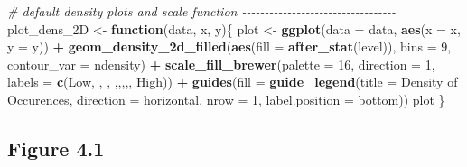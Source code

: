 \documentclass[
]{book}
\newenvironment{Shaded}{\begin{snugshade}}{\end{snugshade}}
\newcommand{\AttributeTok}[1]{\textcolor[rgb]{0.13,0.29,0.53}{#1}}
\newcommand{\CommentTok}[1]{\textcolor[rgb]{0.56,0.35,0.01}{\textit{#1}}}
\newcommand{\ControlFlowTok}[1]{\textcolor[rgb]{0.13,0.29,0.53}{\textbf{#1}}}
\newcommand{\DecValTok}[1]{\textcolor[rgb]{0.00,0.00,0.81}{#1}}
\newcommand{\FunctionTok}[1]{\textcolor[rgb]{0.13,0.29,0.53}{\textbf{#1}}}
\newcommand{\NormalTok}[1]{#1}
\newcommand{\OtherTok}[1]{\textcolor[rgb]{0.56,0.35,0.01}{#1}}
\newcommand{\SpecialCharTok}[1]{\textcolor[rgb]{0.81,0.36,0.00}{\textbf{#1}}}
\newcommand{\StringTok}[1]{\textcolor[rgb]{0.31,0.60,0.02}{#1}}
\begin{document}
\begin{Shaded}
\begin{Highlighting}[]
\CommentTok{\# default density plots and scale function {-}{-}{-}{-}{-}{-}{-}{-}{-}{-}{-}{-}{-}{-}{-}{-}{-}{-}{-}{-}{-}{-}{-}{-}{-}{-}{-}{-}{-}{-}{-}{-}{-}{-}}
\NormalTok{plot\_dens\_2D }\OtherTok{\textless{}{-}} \ControlFlowTok{function}\NormalTok{(data, x, y)\{}
\NormalTok{  plot }\OtherTok{\textless{}{-}} \FunctionTok{ggplot}\NormalTok{(}\AttributeTok{data =}\NormalTok{ data, }\FunctionTok{aes}\NormalTok{(}\AttributeTok{x =}\NormalTok{ x, }\AttributeTok{y =}\NormalTok{ y)) }\SpecialCharTok{+} 
    \FunctionTok{geom\_density\_2d\_filled}\NormalTok{(}\FunctionTok{aes}\NormalTok{(}\AttributeTok{fill =} \FunctionTok{after\_stat}\NormalTok{(level)),}
                           \AttributeTok{bins =} \DecValTok{9}\NormalTok{, }\AttributeTok{contour\_var =} \StringTok{\textquotesingle{}ndensity\textquotesingle{}}\NormalTok{) }\SpecialCharTok{+}
    \FunctionTok{scale\_fill\_brewer}\NormalTok{(}\AttributeTok{palette =} \DecValTok{16}\NormalTok{, }\AttributeTok{direction =} \DecValTok{1}\NormalTok{, }
                      \AttributeTok{labels =} \FunctionTok{c}\NormalTok{(}\StringTok{\textquotesingle{}Low\textquotesingle{}}\NormalTok{, }\StringTok{\textquotesingle{}\textquotesingle{}}\NormalTok{, }\StringTok{\textquotesingle{}\textquotesingle{}}\NormalTok{, }\StringTok{\textquotesingle{}\textquotesingle{}}\NormalTok{,}\StringTok{\textquotesingle{}\textquotesingle{}}\NormalTok{,}\StringTok{\textquotesingle{}\textquotesingle{}}\NormalTok{,}\StringTok{\textquotesingle{}\textquotesingle{}}\NormalTok{,}\StringTok{\textquotesingle{}\textquotesingle{}}\NormalTok{, }\StringTok{\textquotesingle{}High\textquotesingle{}}\NormalTok{)) }\SpecialCharTok{+}
    \FunctionTok{guides}\NormalTok{(}\AttributeTok{fill =} \FunctionTok{guide\_legend}\NormalTok{(}\AttributeTok{title =} \StringTok{\textquotesingle{}Density of Occurences\textquotesingle{}}\NormalTok{, }
                               \AttributeTok{direction =} \StringTok{\textquotesingle{}horizontal\textquotesingle{}}\NormalTok{, }\AttributeTok{nrow =} \DecValTok{1}\NormalTok{, }
                               \AttributeTok{label.position =} \StringTok{\textquotesingle{}bottom\textquotesingle{}}\NormalTok{))}
\NormalTok{  plot}
\NormalTok{\}}
\end{Highlighting}
\end{Shaded}

\subsection{Figure 4.1}\label{figure-4.1}
\end{document}
